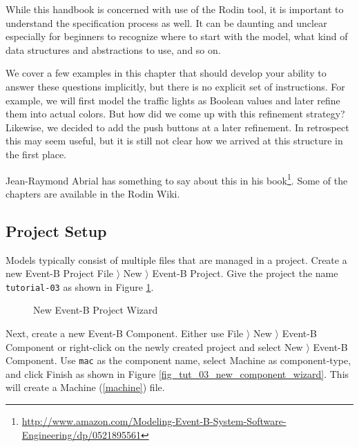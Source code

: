While this handbook is concerned with use of the Rodin tool, it is important to understand the specification process as well.  It can be daunting and unclear especially for beginners to recognize where to start with the model, what kind of data structures and abstractions to use, and so on.

We cover a few examples in this chapter that should develop your ability to answer these questions implicitly, but there is no explicit set of instructions.  For example, we will first model the traffic lights as Boolean values and later refine them into actual colors.  But how did we come up with this refinement strategy?  Likewise, we decided to add the push buttons at a later refinement.  In retrospect this may seem useful, but it is still not clear how we arrived at this structure in the first place.

Jean-Raymond Abrial has something to say about this in his book\footnote{\url{http://www.amazon.com/Modeling-Event-B-System-Software-Engineering/dp/0521895561}}. Some of the chapters are available in the Rodin Wiki.

\subsection{Project Setup}
\label{tut_project_setup}

Models typically consist of multiple files that are managed in a project.  Create a new Event-B Project \textsf{File $\rangle$ New $\rangle$ Event-B Project}.  Give the project the name \texttt{tutorial-03} as shown in Figure \ref{fig_tut_03_new_project_wizard}.

\begin{figure}[!ht]
\begin{center}
	\caption{New Event-B Project Wizard}
	\label{fig_tut_03_new_project_wizard}
\end{center}
\end{figure}


Next, create a new Event-B Component.  Either use \textsf{File $\rangle$ New $\rangle$ Event-B Component} or right-click on the newly created project and select \textsf{New $\rangle$ Event-B Component}.  Use \texttt{mac} as the component name, select \textsf{Machine} as component-type, and click \textsf{Finish} as shown in Figure \ref{fig_tut_03_new_component_wizard}. This will create a Machine (\ref{machine}) file.

